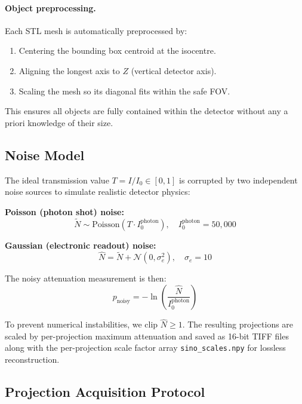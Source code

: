 \documentclass[10pt,twocolumn]{article}
\begin{document}
\paragraph{Object preprocessing.}
Each STL mesh is automatically preprocessed by:
\begin{enumerate}[leftmargin=*,noitemsep]
    \item Centering the bounding box centroid at the isocentre.
    \item Aligning the longest axis to $Z$ (vertical detector axis).
    \item Scaling the mesh so its diagonal fits within the safe FOV.
\end{enumerate}
This ensures all objects are fully contained within the detector
without any a priori knowledge of their size.

\subsection{Noise Model}

The ideal transmission value $T = I/I_0 \in [0, 1]$ is corrupted by
two independent noise sources to simulate realistic detector physics:

\textbf{Poisson (photon shot) noise:}
\begin{equation}
    \tilde{N} \sim \mathrm{Poisson}\!\left(T \cdot I_0^{\mathrm{photon}}\right),
    \quad I_0^{\mathrm{photon}} = 50{,}000
    \label{eq:poisson}
\end{equation}

\textbf{Gaussian (electronic readout) noise:}
\begin{equation}
    \hat{N} = \tilde{N} + \mathcal{N}(0, \sigma_e^2),
    \quad \sigma_e = 10
    \label{eq:gaussian}
\end{equation}

The noisy attenuation measurement is then:
\begin{equation}
    p_{\mathrm{noisy}} = -\ln\!\left(\frac{\hat{N}}{I_0^{\mathrm{photon}}}\right)
    \label{eq:att}
\end{equation}

To prevent numerical instabilities, we clip $\hat{N} \geq 1$.
The resulting projections are scaled by per-projection maximum
attenuation and saved as 16-bit TIFF files along with the per-projection
scale factor array \texttt{sino\_scales.npy} for lossless reconstruction.

\subsection{Projection Acquisition Protocol}
\end{document}
